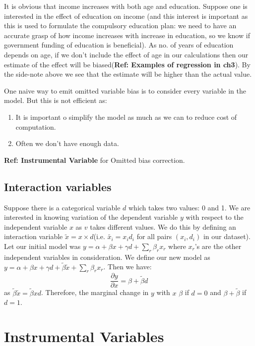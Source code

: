 \documentclass[notoc]{tufte-book}
\begin{document}
\begin{tcolorbox}[colback=c4,colframe=c3,title=Example 1.5: Variation of income with age and education]
It is obvious that income increases with both age and education. Suppose one is interested in the effect of education on income (and this interest is important as this is used to formulate the compulsory education plan: we need to have an accurate grasp of how income increases with increase in education, so we know if government funding of education is beneficial). As no. of years of education depends on age, if we don't include the effect of age in our calculations then our estimate of the effect will be biased(\textbf{Ref: Examples of regression in ch3}). By the side-note above we see that the estimate will be higher than the actual value.
\end{tcolorbox}
One naive way to emit omitted variable bias is to consider every variable in the model. But this is not efficient as:
\begin{enumerate}
    \item It is important o simplify the model as much as we can to reduce cost of computation.
    \item Often we don't have enough data. 
\end{enumerate}
\textbf{Ref: Instrumental Variable} for Omitted bias correction. 
\section{Interaction variables}
Suppose there is a categorical variable $d$ which takes two values: 0 and 1. We are interested in knowing variation of the dependent variable $y$ with respect to the independent variable $x$ as $v$ takes different values. We do this by defining an interaction variable $\tilde x=x\times d$(i.e. $\tilde{x_i}=x_id_i$ for all pairs $(x_i,d_i)$ in our dataset). Let our initial model was $y=\alpha+\beta x+\gamma d+\sum_r \beta_r x_r$ where $x_r$'s are the other independent variables in consideration. We define  our new model as $y=\alpha+\beta x+\gamma d+\tilde\beta \tilde{x}+\sum_r \beta_r x_r$. Then we have:
$$\frac{\partial y}{\partial x}=\beta+\tilde\beta d$$
as $\tilde\beta\tilde x=\tilde \beta xd$. Therefore, the marginal change in $y$ with $x$ $\beta$ if $d=0$ and $\beta+\tilde\beta$ if $d=1$.






\chapter{Instrumental Variables}
\end{document}
